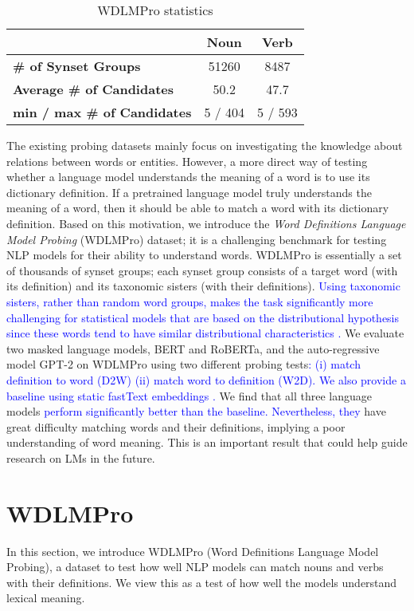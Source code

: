 \documentclass[11pt,a4paper]{article}
\begin{document}
\begin{table}
    \centering
    \begin{tabular}{l|cc}
    \hline
         & \textbf{Noun} & \textbf{Verb} \\ \hline
         \textbf{\# of Synset Groups} & 51260 & 8487 \\
         \textbf{Average \# of Candidates} & 50.2 & 47.7 \\
         \textbf{min / max \# of Candidates} & 5 / 404 & 5 / 593 \\ \hline
    \end{tabular}
    \caption{WDLMPro statistics}
    \label{tab:dataset_stats}
\end{table}

The existing probing datasets mainly focus on investigating
the knowledge about relations between words or
entities. However, a more direct way of testing whether a
language model understands the meaning of a word is to use
its dictionary definition. If a pretrained language model
truly understands the meaning of a word, then it should be
able to match a word with its dictionary definition.  Based
on this motivation, we introduce the \textit{Word
  Definitions Language Model Probing} (WDLMPro) dataset; it
is a challenging benchmark for testing NLP models for their
ability to understand words.  WDLMPro is essentially a set
of thousands of synset groups; each synset group consists of
a target word (with its definition) and its taxonomic
sisters (with their definitions).
\textcolor{blue}{ Using taxonomic sisters,
  rather than random word groups, makes the task
  significantly more challenging for statistical models that
  are based on the distributional hypothesis since these words
  tend to have similar distributional characteristics
  \cite{lenci08distributional}. } We evaluate two masked
language models, BERT and RoBERTa, and the auto-regressive
model GPT-2 on WDLMPro using two different probing
tests\textcolor{blue}{: (i) match definition to word (D2W)
  (ii) match word to definition (W2D). We also provide a
  baseline using static fastText embeddings
  \cite{mikolov18fastText}.}  We find that all three
language models \textcolor{blue}{perform significantly
  better than the baseline. Nevertheless, they} have great
difficulty matching words and their definitions, implying a
poor understanding of word meaning.  This is an important
result that could help guide research on LMs in the future.

\section{WDLMPro}
In this section,
we introduce  WDLMPro (Word Definitions Language Model
Probing), a dataset to test how well NLP models can match
nouns and verbs with  their
definitions.
We view this as a test of how well the models understand lexical meaning.
\end{document}
